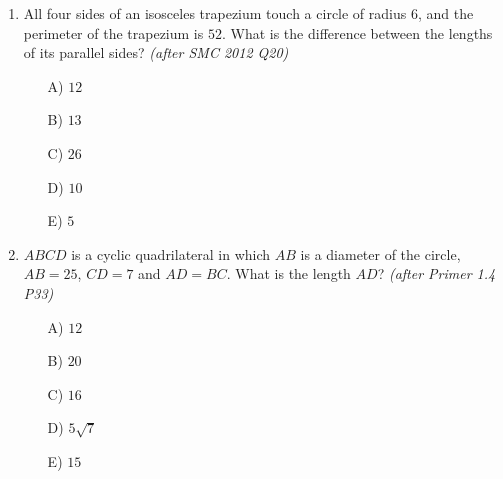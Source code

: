 \documentclass[11pt,a4paper]{article}
\begin{document}
\begin{enumerate}
\item \begin{minipage}[t]{0.60\linewidth}
All four sides of an isosceles trapezium touch a circle of radius $6$, and the perimeter of the trapezium is $52$. What is the difference between the lengths of its parallel sides? \textit{\small(after SMC 2012 Q20)}
\begin{itemize}
\item[A)] $12$
\item[B)] $13$
\item[C)] $26$
\item[D)] $10$
\item[E)] $5$
\end{itemize}
\end{minipage}\hfill
\begin{minipage}[t]{0.36\linewidth}
\vspace{0pt}
\centering
{}
\end{minipage}

\item \begin{minipage}[t]{0.60\linewidth}
$ABCD$ is a cyclic quadrilateral in which $AB$ is a diameter of the circle, $AB=25$, $CD=7$ and $AD=BC$. What is the length $AD$? \textit{\small(after Primer 1.4 P33)}
\begin{itemize}
\item[A)] $12$
\item[B)] $20$
\item[C)] $16$
\item[D)] $5\sqrt7$
\item[E)] $15$
\end{itemize}
\end{minipage}\hfill
\begin{minipage}[t]{0.36\linewidth}
\vspace{0pt}
\centering
{}
\end{minipage}

\end{enumerate}
\end{document}
